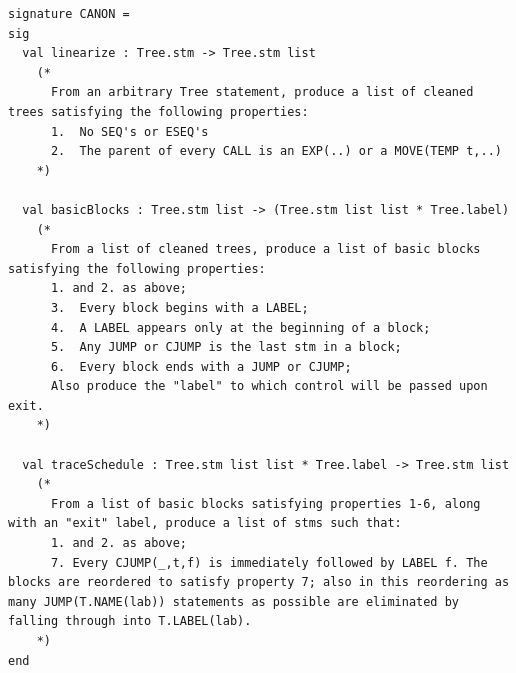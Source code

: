 \documentclass[
]{article}
\begin{document}
\begin{verbatim}
signature CANON = 
sig
  val linearize : Tree.stm -> Tree.stm list
    (* 
      From an arbitrary Tree statement, produce a list of cleaned trees satisfying the following properties:
      1.  No SEQ's or ESEQ's
      2.  The parent of every CALL is an EXP(..) or a MOVE(TEMP t,..)
    *)

  val basicBlocks : Tree.stm list -> (Tree.stm list list * Tree.label)
    (* 
      From a list of cleaned trees, produce a list of basic blocks satisfying the following properties:
      1. and 2. as above;
      3.  Every block begins with a LABEL;
      4.  A LABEL appears only at the beginning of a block;
      5.  Any JUMP or CJUMP is the last stm in a block;
      6.  Every block ends with a JUMP or CJUMP;
      Also produce the "label" to which control will be passed upon exit.
    *)

  val traceSchedule : Tree.stm list list * Tree.label -> Tree.stm list
    (* 
      From a list of basic blocks satisfying properties 1-6, along with an "exit" label, produce a list of stms such that:
      1. and 2. as above;
      7. Every CJUMP(_,t,f) is immediately followed by LABEL f. The blocks are reordered to satisfy property 7; also in this reordering as many JUMP(T.NAME(lab)) statements as possible are eliminated by falling through into T.LABEL(lab).
    *)
end
\end{verbatim}
\end{document}
